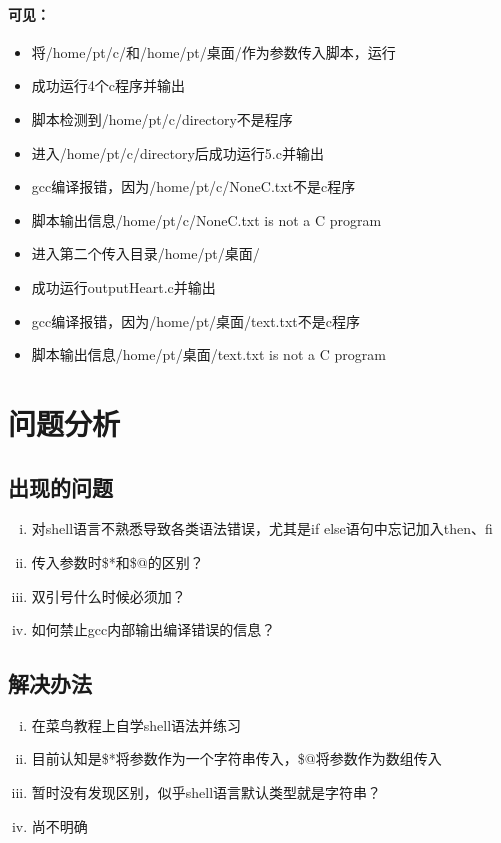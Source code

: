 \documentclass[UTF8]{ctexart}
\begin{document}
    \paragraph{可见：}
    \begin{itemize}
        \item 将/home/pt/c/和/home/pt/桌面/作为参数传入脚本，运行
        \item 成功运行4个c程序并输出
        \item 脚本检测到/home/pt/c/directory不是程序
        \item 进入/home/pt/c/directory后成功运行5.c并输出
        \item gcc编译报错，因为/home/pt/c/NoneC.txt不是c程序
        \item 脚本输出信息/home/pt/c/NoneC.txt is not a C program
        \item 进入第二个传入目录/home/pt/桌面/
        \item 成功运行outputHeart.c并输出
        \item gcc编译报错，因为/home/pt/桌面/text.txt不是c程序
        \item 脚本输出信息/home/pt/桌面/text.txt is not a C program
    \end{itemize}
    \section{问题分析}
    \subsection{出现的问题}
    \begin{enumerate}[i.]
        \item 对shell语言不熟悉导致各类语法错误，尤其是if else语句中忘记加入then、fi
        \item 传入参数时\$*和\$@的区别？
        \item 双引号什么时候必须加？
        \item 如何禁止gcc内部输出编译错误的信息？
    \end{enumerate}
    
    \subsection{解决办法}
    \begin{enumerate}[i.]
        \item 在菜鸟教程上自学shell语法并练习
        \item 目前认知是\$*将参数作为一个字符串传入，\$@将参数作为数组传入
        \item 暂时没有发现区别，似乎shell语言默认类型就是字符串？
        \item 尚不明确
    \end{enumerate}
\end{document}
